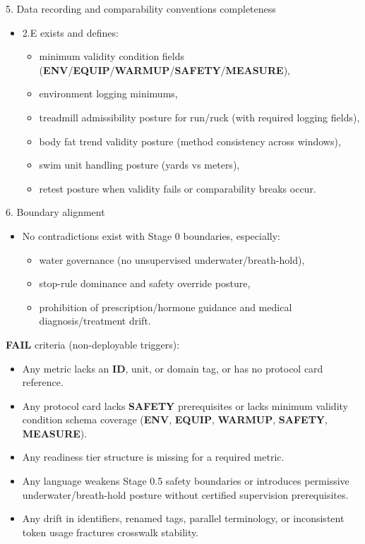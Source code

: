 \documentclass[10pt]{article}
\begin{document}
5. Data recording and comparability conventions completeness

\begin{itemize}
\item 2.E exists and defines:
  \begin{itemize}
  \item minimum validity condition fields (\textbf{ENV}/\textbf{EQUIP}/\textbf{WARMUP}/\textbf{SAFETY}/\textbf{MEASURE}),
  \item environment logging minimums,
  \item treadmill admissibility posture for run/ruck (with required logging fields),
  \item body fat trend validity posture (method consistency across windows),
  \item swim unit handling posture (yards vs meters),
  \item retest posture when validity fails or comparability breaks occur.
  \end{itemize}
\end{itemize}

6. Boundary alignment

\begin{itemize}
\item No contradictions exist with Stage 0 boundaries, especially:
  \begin{itemize}
  \item water governance (no unsupervised underwater/breath-hold),
  \item stop-rule dominance and safety override posture,
  \item prohibition of prescription/hormone guidance and medical diagnosis/treatment drift.
  \end{itemize}
\end{itemize}

\textbf{FAIL} criteria (non-deployable triggers):

\begin{itemize}
\item Any metric lacks an \textbf{ID}, unit, or domain tag, or has no protocol card reference.
\item Any protocol card lacks \textbf{SAFETY} prerequisites or lacks minimum validity condition schema coverage (\textbf{ENV}, \textbf{EQUIP}, \textbf{WARMUP}, \textbf{SAFETY}, \textbf{MEASURE}).
\item Any readiness tier structure is missing for a required metric.
\item Any language weakens Stage 0.5 safety boundaries or introduces permissive underwater/breath-hold posture without certified supervision prerequisites.
\item Any drift in identifiers, renamed tags, parallel terminology, or inconsistent token usage fractures crosswalk stability.
\end{itemize}
\end{document}
